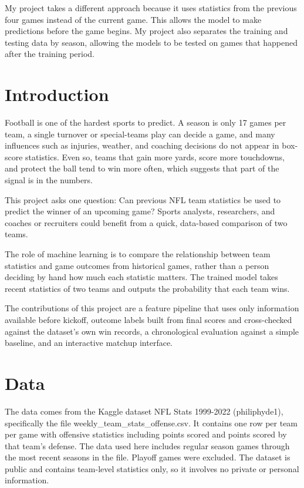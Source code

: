 \documentclass[sigconf,nonacm]{acmart}
\begin{document}
My project takes a different approach because it uses statistics from the previous four games instead of the current game. This allows the model to make predictions before the game begins. My project also separates the training and testing data by season, allowing the models to be tested on games that happened after the training period.

\section{Introduction}
Football is one of the hardest sports to predict. A season is only 17 games per team, a single turnover or special-teams play can decide a game, and many influences such as injuries, weather, and coaching decisions do not appear in box-score statistics. Even so, teams that gain more yards, score more touchdowns, and protect the ball tend to win more often, which suggests that part of the signal is in the numbers.

This project asks one question: Can previous NFL team statistics be used to predict the winner of an upcoming game? Sports analysts, researchers, and coaches or recruiters could benefit from a quick, data-based comparison of two teams.

The role of machine learning is to compare the relationship between team statistics and game outcomes from historical games, rather than a person deciding by hand how much each statistic matters. The trained model takes recent statistics of two teams and outputs the probability that each team wins.

The contributions of this project are a feature pipeline that uses only information available before kickoff, outcome labels built from final scores and cross-checked against the dataset's own win records, a chronological evaluation against a simple baseline, and an interactive matchup interface.

\section{Data}
The data comes from the Kaggle dataset NFL Stats 1999-2022 (philiphyde1), specifically the file weekly\_team\_stats\_offense.csv. It contains one row per team per game with offensive statistics including points scored and points scored by that team's defense. The data used here includes regular season games through the most recent seasons in the file. Playoff games were excluded. The dataset is public and contains team-level statistics only, so it involves no private or personal information.
\end{document}
